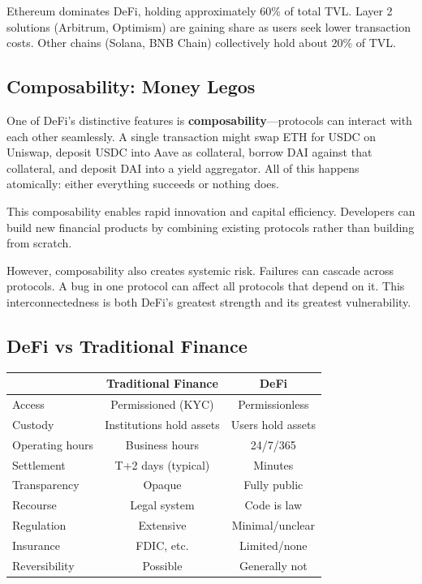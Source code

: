 \documentclass[11pt,a4paper]{article}
\newcommand{\keyword}[1]{\textbf{\textcolor{AccentOrange}{#1}}}
\begin{document}
Ethereum dominates DeFi, holding approximately 60\% of total TVL. Layer 2 solutions (Arbitrum, Optimism) are gaining share as users seek lower transaction costs. Other chains (Solana, BNB Chain) collectively hold about 20\% of TVL.

\subsection{Composability: Money Legos}

One of DeFi's distinctive features is \keyword{composability}---protocols can interact with each other seamlessly. A single transaction might swap ETH for USDC on Uniswap, deposit USDC into Aave as collateral, borrow DAI against that collateral, and deposit DAI into a yield aggregator. All of this happens atomically: either everything succeeds or nothing does.

This composability enables rapid innovation and capital efficiency. Developers can build new financial products by combining existing protocols rather than building from scratch.

However, composability also creates systemic risk. Failures can cascade across protocols. A bug in one protocol can affect all protocols that depend on it. This interconnectedness is both DeFi's greatest strength and its greatest vulnerability.

\subsection{DeFi vs Traditional Finance}

\begin{center}
\begin{tabular}{lcc}
\toprule
& \textbf{Traditional Finance} & \textbf{DeFi} \\
\midrule
Access & Permissioned (KYC) & Permissionless \\
Custody & Institutions hold assets & Users hold assets \\
Operating hours & Business hours & 24/7/365 \\
Settlement & T+2 days (typical) & Minutes \\
Transparency & Opaque & Fully public \\
Recourse & Legal system & Code is law \\
\midrule
Regulation & Extensive & Minimal/unclear \\
Insurance & FDIC, etc. & Limited/none \\
Reversibility & Possible & Generally not \\
\bottomrule
\end{tabular}
\end{center}
\end{document}
